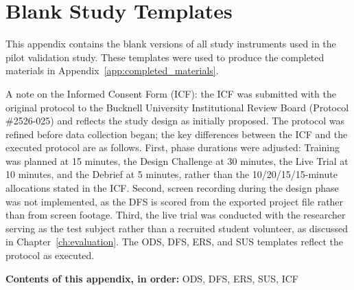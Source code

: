 \chapter{Blank Study Templates}
\label{app:blank_templates}

This appendix contains the blank versions of all study instruments used in the pilot validation study. These templates were used to produce the completed materials in Appendix~\ref{app:completed_materials}.

A note on the Informed Consent Form (ICF): the ICF was submitted with the original protocol to the Bucknell University Institutional Review Board (Protocol \#2526-025) and reflects the study design as initially proposed. The protocol was refined before data collection began; the key differences between the ICF and the executed protocol are as follows. First, phase durations were adjusted: Training was planned at 15 minutes, the Design Challenge at 30 minutes, the Live Trial at 10 minutes, and the Debrief at 5 minutes, rather than the 10/20/15/15-minute allocations stated in the ICF. Second, screen recording during the design phase was not implemented, as the DFS is scored from the exported project file rather than from screen footage. Third, the live trial was conducted with the researcher serving as the test subject rather than a recruited student volunteer, as discussed in Chapter~\ref{ch:evaluation}. The ODS, DFS, ERS, and SUS templates reflect the protocol as executed.

\medskip
\noindent\textbf{Contents of this appendix, in order:} ODS, DFS, ERS, SUS, ICF






